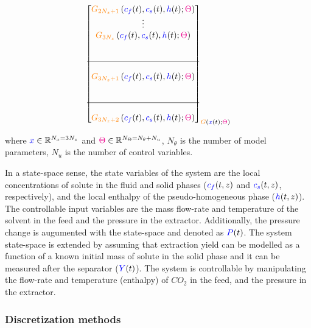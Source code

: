 \documentclass[../Article_Model_Parameters.tex]{subfiles}
\begin{document}
{\begin{align*}
{\begin{bmatrix}
							{\color{orange}G_{2N_z+1}} \left( {\color{blue}c_f}(t),{\color{blue}c_s}(t),{\color{blue}h}(t); {\color{magenta}\Theta} \right) \\
							\vdots\\
							{\color{orange}G_{3N_z}} \left( {\color{blue}c_f}(t),{\color{blue}c_s}(t),{\color{blue}h}(t); {\color{magenta}\Theta} \right) \\ 
							\\ \\ \hline \\
							{\color{orange}G_{3N_z+1}} \left( {\color{blue}c_f}(t),{\color{blue}c_s}(t),{\color{blue}h}(t); {\color{magenta}\Theta} \right) \\
							\\ \\ \hline \\
							{\color{orange}G_{3N_z+2}} \left( {\color{blue}c_f}(t),{\color{blue}c_s}(t),{\color{blue}h}(t); {\color{magenta}\Theta} \right) 
					\end{bmatrix}}_{{\color{orange}G} \left( {\color{blue}x}(t); {\color{magenta}\Theta} \right)} 
			\end{align*} }
			
			where ${\color{blue}x} \in \mathbb{R}^{N_x = 3N_z} $ and ${\color{magenta}\Theta} \in \mathbb{R}^{N_\Theta =  N_{\theta} + N_u } $, $N_{\theta}$ is the number of model parameters, $N_{u}$ is the number of control variables.
			
			In a state-space sense, the state variables of the system are the local concentrations of solute in the fluid and solid phases (${\color{blue}c_f}(t,z)$ and ${\color{blue}c_s}(t,z)$, respectively), and the local enthalpy of the pseudo-homogeneous phase (${\color{blue}h}(t,z)$). The controllable input variables are the mass flow-rate and temperature of the solvent in the feed and the pressure in the extractor. Additionally, the pressure change is augumented with the state-space and denoted as ${\color{blue}P}(t)$.
			The system state-space is extended by assuming that extraction yield can be modelled as a function of a known initial mass of solute in the solid phase and it can be measured after the separator (${\color{blue}Y}(t)$). The system is controllable by manipulating the flow-rate and temperature (enthalpy) of $CO_2$ in the feed, and the pressure in the extractor.
			
			\subsubsection{Discretization methods}
			
\end{document}
